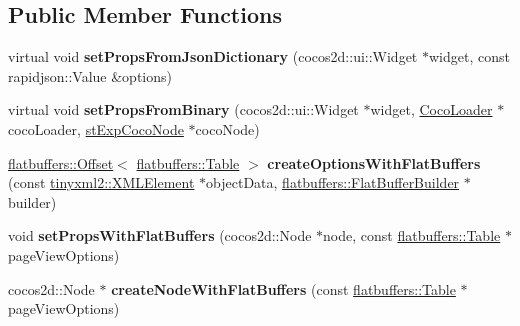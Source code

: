 \subsection*{Public Member Functions}
\begin{DoxyCompactItemize}
\item 
\mbox{\label{classcocostudio_1_1PageViewReader_aa8d935faff61d2f0d5e1d05c661e90c1}} 
virtual void {\bfseries set\+Props\+From\+Json\+Dictionary} (cocos2d\+::ui\+::\+Widget $\ast$widget, const rapidjson\+::\+Value \&options)
\item 
\mbox{\label{classcocostudio_1_1PageViewReader_acf2d9279911d23ce097963cf61737e40}} 
virtual void {\bfseries set\+Props\+From\+Binary} (cocos2d\+::ui\+::\+Widget $\ast$widget, \hyperlink{classcocostudio_1_1CocoLoader}{Coco\+Loader} $\ast$coco\+Loader, \hyperlink{structcocostudio_1_1stExpCocoNode}{st\+Exp\+Coco\+Node} $\ast$coco\+Node)
\item 
\mbox{\label{classcocostudio_1_1PageViewReader_a5f1315892446577e4e27d4ddde9b5cf6}} 
\hyperlink{structflatbuffers_1_1Offset}{flatbuffers\+::\+Offset}$<$ \hyperlink{classflatbuffers_1_1Table}{flatbuffers\+::\+Table} $>$ {\bfseries create\+Options\+With\+Flat\+Buffers} (const \hyperlink{classtinyxml2_1_1XMLElement}{tinyxml2\+::\+X\+M\+L\+Element} $\ast$object\+Data, \hyperlink{classflatbuffers_1_1FlatBufferBuilder}{flatbuffers\+::\+Flat\+Buffer\+Builder} $\ast$builder)
\item 
\mbox{\label{classcocostudio_1_1PageViewReader_a6ec7308dcabf9d6e93b6fe2c6b9e7224}} 
void {\bfseries set\+Props\+With\+Flat\+Buffers} (cocos2d\+::\+Node $\ast$node, const \hyperlink{classflatbuffers_1_1Table}{flatbuffers\+::\+Table} $\ast$page\+View\+Options)
\item 
\mbox{\label{classcocostudio_1_1PageViewReader_a7d160fe97df29ae9bc4dc58f1430118a}} 
cocos2d\+::\+Node $\ast$ {\bfseries create\+Node\+With\+Flat\+Buffers} (const \hyperlink{classflatbuffers_1_1Table}{flatbuffers\+::\+Table} $\ast$page\+View\+Options)
\item 
\mbox{\label{classcocostudio_1_1PageViewReader_a406bf75de221db3f513a7daccbc4f047}} 

\end{DoxyCompactItemize}
